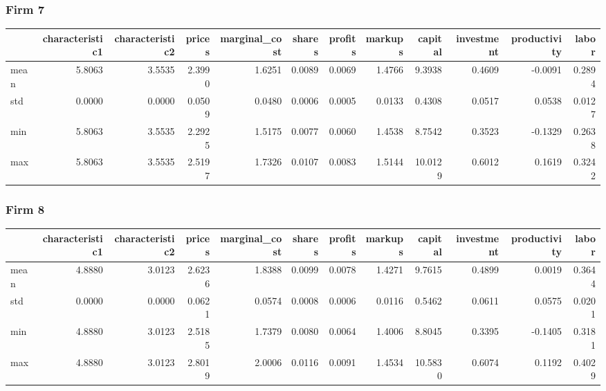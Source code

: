  \subsubsection*{Firm 7}
\begin{tabular}{lrrrrrrrrrrr}
\toprule
{} &  characteristic1 &  characteristic2 &  prices &  marginal\_cost &  shares &  profits &  markups &  capital &  investment &  productivity &  labor \\
\midrule
mean &           5.8063 &           3.5535 &  2.3990 &         1.6251 &  0.0089 &   0.0069 &   1.4766 &   9.3938 &      0.4609 &       -0.0091 & 0.2894 \\
std  &           0.0000 &           0.0000 &  0.0509 &         0.0480 &  0.0006 &   0.0005 &   0.0133 &   0.4308 &      0.0517 &        0.0538 & 0.0127 \\
min  &           5.8063 &           3.5535 &  2.2925 &         1.5175 &  0.0077 &   0.0060 &   1.4538 &   8.7542 &      0.3523 &       -0.1329 & 0.2638 \\
max  &           5.8063 &           3.5535 &  2.5197 &         1.7326 &  0.0107 &   0.0083 &   1.5144 &  10.0129 &      0.6012 &        0.1619 & 0.3242 \\
\bottomrule
\end{tabular}


 \subsubsection*{Firm 8}
\begin{tabular}{lrrrrrrrrrrr}
\toprule
{} &  characteristic1 &  characteristic2 &  prices &  marginal\_cost &  shares &  profits &  markups &  capital &  investment &  productivity &  labor \\
\midrule
mean &           4.8880 &           3.0123 &  2.6236 &         1.8388 &  0.0099 &   0.0078 &   1.4271 &   9.7615 &      0.4899 &        0.0019 & 0.3644 \\
std  &           0.0000 &           0.0000 &  0.0621 &         0.0574 &  0.0008 &   0.0006 &   0.0116 &   0.5462 &      0.0611 &        0.0575 & 0.0201 \\
min  &           4.8880 &           3.0123 &  2.5185 &         1.7379 &  0.0080 &   0.0064 &   1.4006 &   8.8045 &      0.3395 &       -0.1405 & 0.3181 \\
max  &           4.8880 &           3.0123 &  2.8019 &         2.0006 &  0.0116 &   0.0091 &   1.4534 &  10.5830 &      0.6074 &        0.1192 & 0.4029 \\
\bottomrule
\end{tabular}



